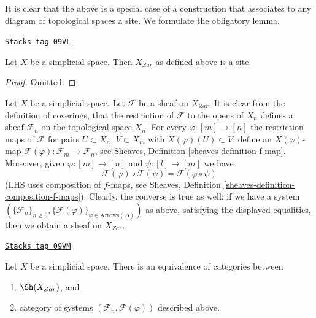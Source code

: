 It is clear that the above is a special case of a construction that
associates to any diagram of topological spaces a site. We formulate
the obligatory lemma.

\begin{lemma}
\label{spaces-simplicial-lemma-simplicial-site}
\href{https://stacks.math.columbia.edu/tag/09VL}{\texttt{Stacks tag 09VL}}

Let $X$ be a simplicial space. Then $X_{Zar}$
as defined above is a site.
\end{lemma}

\begin{proof}
Omitted.
\end{proof}

Let $X$ be a simplicial space. Let $\mathcal{F}$ be a sheaf on $X_{Zar}$.
It is clear from the definition of coverings, that the restriction
of $\mathcal{F}$ to the opens of $X_n$ defines a sheaf $\mathcal{F}_n$
on the topological space $X_n$. For every $\varphi : [m] \to [n]$ the
restriction maps of $\mathcal{F}$ for pairs $U \subset X_n$, $V \subset X_m$
with $X(\varphi)(U) \subset V$, define an $X(\varphi)$-map
$\mathcal{F}(\varphi) : \mathcal{F}_m \to \mathcal{F}_n$, see
Sheaves, Definition \ref{sheaves-definition-f-map}.
Moreover, given $\varphi : [m] \to [n]$ and $\psi : [l] \to [m]$
we have
$$
\mathcal{F}(\varphi) \circ \mathcal{F}(\psi) =
\mathcal{F}(\varphi \circ \psi)
$$
(LHS uses composition of $f$-maps, see
Sheaves, Definition \ref{sheaves-definition-composition-f-maps}).
Clearly, the converse is true as well: if we have a system
$(\{\mathcal{F}_n\}_{n \geq 0},
\{\mathcal{F}(\varphi)\}_{\varphi \in \text{Arrows}(\Delta)})$
as above, satisfying the displayed equalities,
then we obtain a sheaf on $X_{Zar}$.

\begin{lemma}
\label{spaces-simplicial-lemma-describe-sheaves-simplicial-site}
\href{https://stacks.math.columbia.edu/tag/09VM}{\texttt{Stacks tag 09VM}}

Let $X$ be a simplicial space. There is an equivalence of
categories between
\begin{enumerate}
\item $\Sh(X_{Zar})$, and
\item category of systems $(\mathcal{F}_n, \mathcal{F}(\varphi))$
described above.
\end{enumerate}
\end{lemma}

